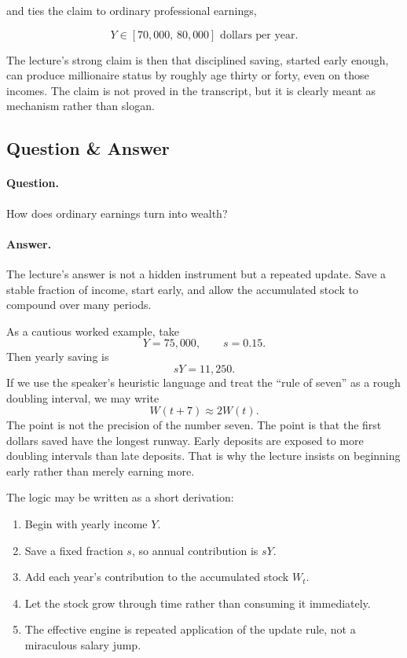 and ties the claim to ordinary professional earnings,

\begin{equation}
Y \in [70{,}000,\,80{,}000] \text{ dollars per year}.
\end{equation}

The lecture's strong claim is then that disciplined saving, started early enough, can produce millionaire status by roughly age thirty or forty, even on those incomes. The claim is not proved in the transcript, but it is clearly meant as mechanism rather than slogan.

\subsection{Question \& Answer}

\paragraph{Question.} How does ordinary earnings turn into wealth?

\paragraph{Answer.} The lecture's answer is not a hidden instrument but a repeated update. Save a stable fraction of income, start early, and allow the accumulated stock to compound over many periods.

As a cautious worked example, take
\[
Y = 75{,}000,
\qquad
s = 0.15.
\]
Then yearly saving is
\begin{equation}
sY = 11{,}250.
\end{equation}
If we use the speaker's heuristic language and treat the ``rule of seven'' as a rough doubling interval, we may write
\begin{equation}
W(t+7) \approx 2W(t).
\end{equation}
The point is not the precision of the number seven. The point is that the first dollars saved have the longest runway. Early deposits are exposed to more doubling intervals than late deposits. That is why the lecture insists on beginning early rather than merely earning more.

The logic may be written as a short derivation:
\begin{enumerate}
\item Begin with yearly income \(Y\).
\item Save a fixed fraction \(s\), so annual contribution is \(sY\).
\item Add each year's contribution to the accumulated stock \(W_t\).
\item Let the stock grow through time rather than consuming it immediately.
\item The effective engine is repeated application of the update rule, not a miraculous salary jump.
\end{enumerate}


